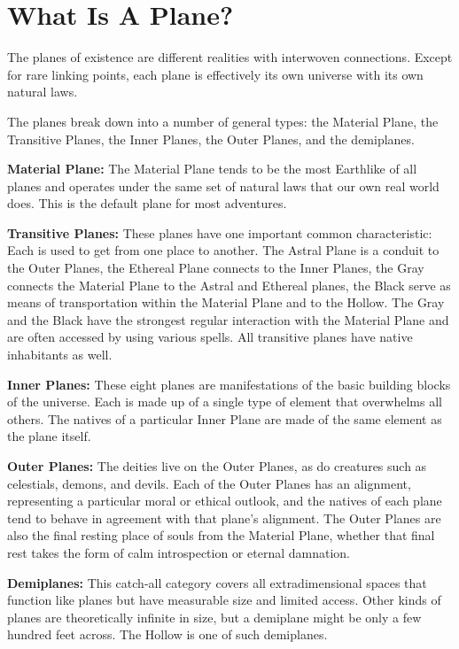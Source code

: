 \section{What Is A Plane?}
The planes of existence are different realities with interwoven connections. Except for rare linking points, each plane is effectively its own universe with its own natural laws.

The planes break down into a number of general types: the Material Plane, the Transitive Planes, the Inner Planes, the Outer Planes, and the demiplanes.

\textbf{Material Plane:} The Material Plane tends to be the most Earthlike of all planes and operates under the same set of natural laws that our own real world does. This is the default plane for most adventures.

\textbf{Transitive Planes:} These planes have one important common characteristic: Each is used to get from one place to another. The Astral Plane is a conduit to the Outer Planes, the Ethereal Plane connects to the Inner Planes, the Gray connects the Material Plane to the Astral and Ethereal planes, the Black serve as means of transportation within the Material Plane and to the Hollow. The Gray and the Black have the strongest regular interaction with the Material Plane and are often accessed by using various spells. All transitive planes have native inhabitants as well.

\textbf{Inner Planes:} These eight planes are manifestations of the basic building blocks of the universe. Each is made up of a single type of element that overwhelms all others. The natives of a particular Inner Plane are made of the same element as the plane itself.

\textbf{Outer Planes:} The deities live on the Outer Planes, as do creatures such as celestials, demons, and devils. Each of the Outer Planes has an alignment, representing a particular moral or ethical outlook, and the natives of each plane tend to behave in agreement with that plane's alignment. The Outer Planes are also the final resting place of souls from the Material Plane, whether that final rest takes the form of calm introspection or eternal damnation.

\textbf{Demiplanes:} This catch-all category covers all extradimensional spaces that function like planes but have measurable size and limited access. Other kinds of planes are theoretically infinite in size, but a demiplane might be only a few hundred feet across. The Hollow is one of such demiplanes.
